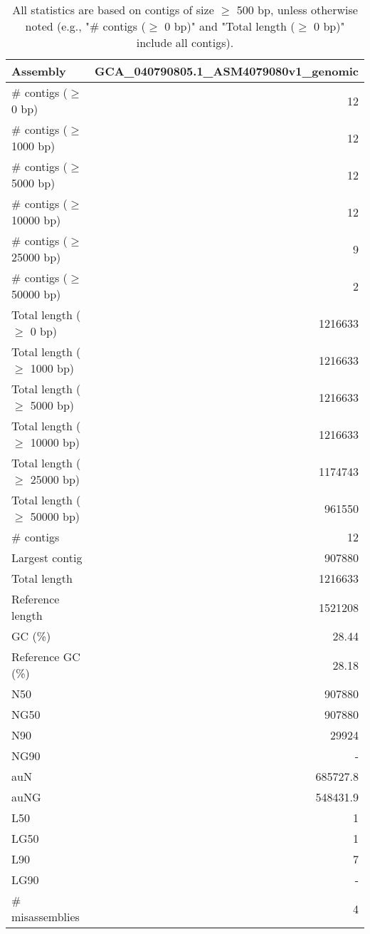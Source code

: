 \documentclass[12pt,a4paper]{article}
\begin{document}
\begin{table}[ht]
\begin{center}
\caption{All statistics are based on contigs of size $\geq$ 500 bp, unless otherwise noted (e.g., "\# contigs ($\geq$ 0 bp)" and "Total length ($\geq$ 0 bp)" include all contigs).}
\begin{tabular}{|l*{1}{|r}|}
\hline
Assembly & GCA\_040790805.1\_ASM4079080v1\_genomic \\ \hline
\# contigs ($\geq$ 0 bp) & 12 \\ \hline
\# contigs ($\geq$ 1000 bp) & 12 \\ \hline
\# contigs ($\geq$ 5000 bp) & 12 \\ \hline
\# contigs ($\geq$ 10000 bp) & 12 \\ \hline
\# contigs ($\geq$ 25000 bp) & 9 \\ \hline
\# contigs ($\geq$ 50000 bp) & 2 \\ \hline
Total length ($\geq$ 0 bp) & 1216633 \\ \hline
Total length ($\geq$ 1000 bp) & 1216633 \\ \hline
Total length ($\geq$ 5000 bp) & 1216633 \\ \hline
Total length ($\geq$ 10000 bp) & 1216633 \\ \hline
Total length ($\geq$ 25000 bp) & 1174743 \\ \hline
Total length ($\geq$ 50000 bp) & 961550 \\ \hline
\# contigs & 12 \\ \hline
Largest contig & 907880 \\ \hline
Total length & 1216633 \\ \hline
Reference length & 1521208 \\ \hline
GC (\%) & 28.44 \\ \hline
Reference GC (\%) & 28.18 \\ \hline
N50 & 907880 \\ \hline
NG50 & 907880 \\ \hline
N90 & 29924 \\ \hline
NG90 & - \\ \hline
auN & 685727.8 \\ \hline
auNG & 548431.9 \\ \hline
L50 & 1 \\ \hline
LG50 & 1 \\ \hline
L90 & 7 \\ \hline
LG90 & - \\ \hline
\# misassemblies & 4 \\ \hline

\end{tabular}
\end{center}
\end{table}
\end{document}
